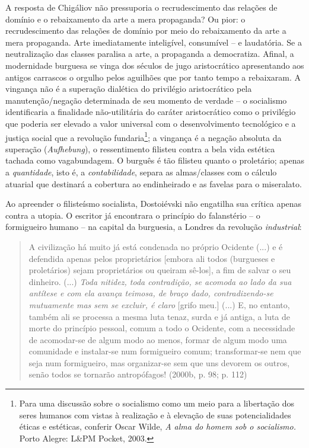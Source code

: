 A resposta de Chigáliov não pressuporia o recrudescimento das relações
de domínio e o rebaixamento da arte a mera propaganda? Ou pior: o
recrudescimento das relações de domínio por meio do rebaixamento da arte
a mera propaganda. Arte imediatamente inteligível, consumível -- e
laudatória. Se a neutralização das classes paralisa a arte, a propaganda
a democratiza. Afinal, a modernidade burguesa se vinga dos séculos de
jugo aristocrático apresentando aos antigos carrascos o orgulho pelos
aguilhões que por tanto tempo a rebaixaram. A vingança não é a superação
dialética do privilégio aristocrático pela manutenção/negação
determinada de seu momento de verdade -- o socialismo identificaria a
finalidade não-utilitária do caráter aristocrático como o privilégio que
poderia ser elevado a valor universal com o desenvolvimento tecnológico
e a justiça social que a revolução fundaria\footnote{Para uma discussão
  sobre o socialismo como um meio para a libertação dos seres humanos
  com vistas à realização e à elevação de suas potencialidades éticas e
  estéticas, conferir Oscar Wilde, \emph{A alma do homem sob o
  socialismo.} Porto Alegre: L\&PM Pocket, 2003.}; a vingança é a
negação absoluta da superação (\emph{Aufhebung}), o ressentimento
filisteu contra a bela vida estética tachada como vagabundagem. O
burguês é tão filisteu quanto o proletário; apenas a \emph{quantidade},
isto é, a \emph{contabilidade}, separa as almas/classes com o cálculo
atuarial que destinará a cobertura ao endinheirado e as favelas para o
miseralato.

Ao apreender o filisteísmo socialista, Dostoiévski não engatilha sua
crítica apenas contra a utopia. O escritor já encontrara o princípio do
falanstério -- o formigueiro humano -- na capital da burguesia, a
Londres da revolução \emph{industrial}:

\begin{quote}
A civilização há muito já está condenada no próprio Ocidente (...) e é
defendida apenas pelos proprietários {[}embora ali todos (burgueses e
proletários) sejam proprietários ou queiram sê-los{]}, a fim de salvar o
seu dinheiro. (...) \emph{Toda nitidez, toda contradição, se acomoda ao
lado da sua antítese e com ela avança teimosa, de braço dado,
contradizendo-se mutuamente mas sem se excluir, é claro} {[}grifo
meu.{]} (...) E, no entanto, também ali se processa a mesma luta tenaz,
surda e já antiga, a luta de morte do princípio pessoal, comum a todo o
Ocidente, com a necessidade de acomodar-se de algum modo ao menos,
formar de algum modo uma comunidade e instalar-se num formigueiro comum;
transformar-se nem que seja num formigueiro, mas organizar-se sem que
uns devorem os outros, senão todos se tornarão antropófagos! (2000b, p.
98; p. 112)
\end{quote}

